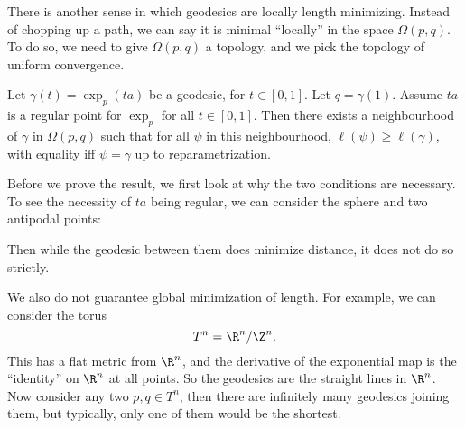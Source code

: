 \documentclass[a4paper]{article}
\begin{document}
There is another sense in which geodesics are locally length minimizing. Instead of chopping up a path, we can say it is minimal ``locally'' in the space $\Omega(p, q)$. To do so, we need to give $\Omega(p, q)$ a topology, and we pick the topology of uniform convergence.

\begin{thm}
  Let $\gamma(t) = \exp_p(ta)$ be a geodesic, for $t \in [0, 1]$. Let $q = \gamma(1)$. Assume $ta$ is a regular point for $\exp_p$ for all $t \in [0, 1]$. Then there exists a neighbourhood of $\gamma$ in $\Omega(p, q)$ such that for all $\psi$ in this neighbourhood, $\ell(\psi) \geq \ell(\gamma)$, with equality iff $\psi = \gamma$ up to reparametrization.
\end{thm}
Before we prove the result, we first look at why the two conditions are necessary. To see the necessity of $ta$ being regular, we can consider the sphere and two antipodal points:
\begin{center}
\end{center}
Then while the geodesic between them does minimize distance, it does not do so strictly.

We also do not guarantee global minimization of length. For example, we can consider the torus
\[
  T^n = \R^n/\Z^n.
\]
This has a flat metric from $\R^n$, and the derivative of the exponential map is the ``identity'' on $\R^n$ at all points. So the geodesics are the straight lines in $\R^n$. Now consider any two $p, q \in T^n$, then there are infinitely many geodesics joining them, but typically, only one of them would be the shortest.
\begin{center}
\end{center}
\end{document}
